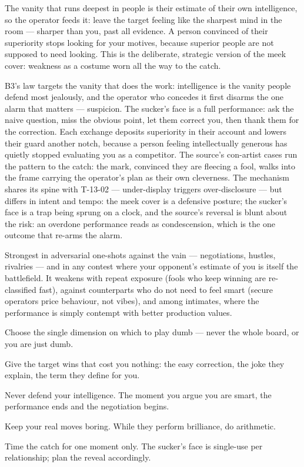 \begin{core}
The vanity that runs deepest in people is their estimate of their own intelligence, so the operator feeds it: leave the target feeling like the sharpest mind in the room --- sharper than you, past all evidence. A person convinced of their superiority stops looking for your motives, because superior people are not supposed to need looking. This is the deliberate, strategic version of the meek cover: weakness as a costume worn all the way to the catch.
\end{core}
\begin{mechanism}
B3's law targets the vanity that does the work: intelligence is the vanity people defend most jealously, and the operator who concedes it first disarms the one alarm that matters --- suspicion. The sucker's face is a full performance: ask the naive question, miss the obvious point, let them correct you, then thank them for the correction. Each exchange deposits superiority in their account and lowers their guard another notch, because a person feeling intellectually generous has quietly stopped evaluating you as a competitor. The source's con-artist cases run the pattern to the catch: the mark, convinced they are fleecing a fool, walks into the frame carrying the operator's plan as their own cleverness. The mechanism shares its spine with T-13-02 --- under-display triggers over-disclosure --- but differs in intent and tempo: the meek cover is a defensive posture; the sucker's face is a trap being sprung on a clock, and the source's reversal is blunt about the risk: an overdone performance reads as condescension, which is the one outcome that re-arms the alarm.
\end{mechanism}
\begin{conditions}
Strongest in adversarial one-shots against the vain --- negotiations, hustles, rivalries --- and in any contest where your opponent's estimate of you is itself the battlefield. It weakens with repeat exposure (fools who keep winning are re-classified fast), against counterparts who do not need to feel smart (secure operators price behaviour, not vibes), and among intimates, where the performance is simply contempt with better production values.
\end{conditions}
\begin{application}
  \item Choose the single dimension on which to play dumb --- never the whole board, or you are just dumb.
  \item Give the target wins that cost you nothing: the easy correction, the joke they explain, the term they define for you.
  \item Never defend your intelligence. The moment you argue you are smart, the performance ends and the negotiation begins.
  \item Keep your real moves boring. While they perform brilliance, do arithmetic.
  \item Time the catch for one moment only. The sucker's face is single-use per relationship; plan the reveal accordingly.
\end{application}
